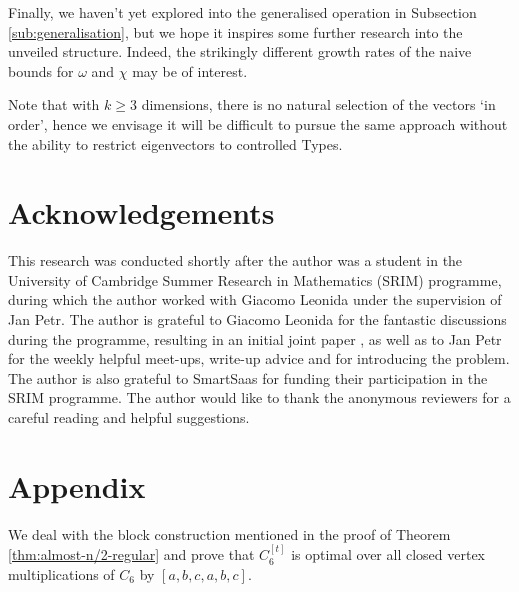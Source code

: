 \documentclass[11pt]{article}
\begin{document}
Finally, we haven't yet explored into the generalised operation in Subsection \ref{sub:generalisation}, but we hope it inspires some further research into the unveiled structure. Indeed, the strikingly different growth rates of the naive bounds for $\omega$ and $\chi$ may be of interest. 

Note that with $k \ge 3$ dimensions, there is no natural selection of the vectors `in order', hence we envisage it will be difficult to pursue the same approach without the ability to restrict eigenvectors to controlled Types.

\section*{Acknowledgements}

This research was conducted shortly after the author was a student in the University of Cambridge Summer Research in Mathematics (SRIM) programme, during which the author worked with Giacomo Leonida under the supervision of Jan Petr. The author is grateful to Giacomo Leonida for the fantastic discussions during the programme, resulting in an initial joint paper \cite{leonida2024structure}, as well as to Jan Petr for the weekly helpful meet-ups, write-up advice and for introducing the problem. The author is also grateful to SmartSaas for funding their participation in the SRIM programme. The author would like to thank
the anonymous reviewers for a careful reading and helpful suggestions.




\section*{Appendix}
\renewcommand{\thesection}{A}
\setcounter{thm}{0}

We deal with the block construction mentioned in the proof of Theorem \ref{thm:almost-n/2-regular} and prove that $C_6^{[t]}$ is optimal over all closed vertex multiplications of $C_6$ by $[a, b, c, a, b, c]$. 
\end{document}
